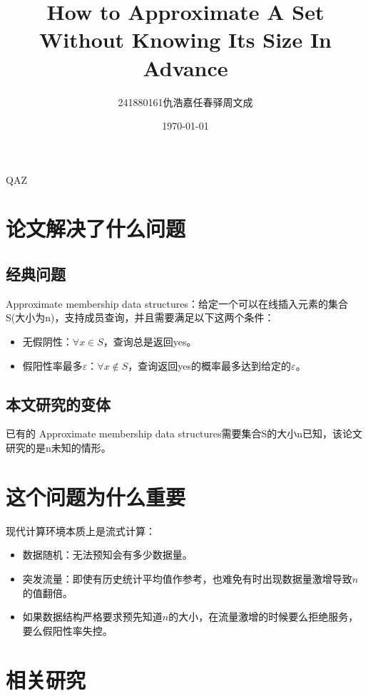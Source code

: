 QAZ\documentclass[UTF8,11pt,a4paper]{ctexart}
\title{\Huge\textbf{How to Approximate A Set
Without Knowing Its Size In Advance}\\[0.5em]}
\author{241880161\quad 仇浩嘉\quad241880136\quad 任春驿\quad241880070\quad 周文成}
\date{\today}
\begin{document}
\maketitle

\vspace{-1.2em}
\begingroup
\small
\setlength{\parskip}{0pt}
\tableofcontents
\endgroup
\newpage
\section{论文解决了什么问题}
\subsection{经典问题}
Approximate membership data structures：给定一个可以在线插入元素的集合S(大小为n)，支持成员查询，并且需要满足以下这两个条件：
\begin{itemize}
    \item 无假阴性：$\forall x \in S$，查询总是返回yes。
    \item 假阳性率最多$\varepsilon$：$\forall x \notin S$，查询返回yes的概率最多达到给定的$\varepsilon$。
\end{itemize}

\subsection{本文研究的变体}
已有的 Approximate membership data structures需要集合S的大小n已知，该论文研究的是n未知的情形。
\section{这个问题为什么重要}
现代计算环境本质上是流式计算：
\begin{itemize}
    \item 数据随机：无法预知会有多少数据量。
    \item 突发流量：即使有历史统计平均值作参考，也难免有时出现数据量激增导致$n$的值翻倍。
    \item 如果数据结构严格要求预先知道$n$的大小，在流量激增的时候要么拒绝服务，要么假阳性率失控。
\end{itemize}

\section{相关研究}
\end{document}
